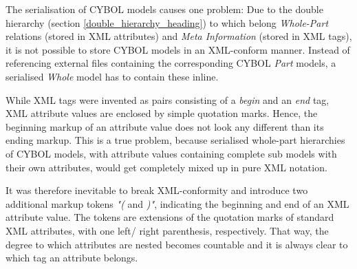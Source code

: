 The serialisation of CYBOL models causes one problem: Due to the double
hierarchy (section \ref{double_hierarchy_heading}) to which belong
\emph{Whole-Part} relations (stored in XML attributes) and
\emph{Meta Information} (stored in XML tags), it is not possible to store CYBOL
models in an XML-conform manner. Instead of referencing external files
containing the corresponding CYBOL \emph{Part} models, a serialised
\emph{Whole} model has to contain these inline.

While XML tags were invented as pairs consisting of a \emph{begin} and an
\emph{end} tag, XML attribute values are enclosed by simple quotation marks.
Hence, the beginning markup of an attribute value does not look any different
than its ending markup. This is a true problem, because serialised whole-part
hierarchies of CYBOL models, with attribute values containing complete sub
models with their own attributes, would get completely mixed up in pure XML
notation.

It was therefore inevitable to break XML-conformity and introduce two
additional markup tokens \emph{"(} and \emph{)"}, indicating the beginning and
end of an XML attribute value. The tokens are extensions of the quotation marks
of standard XML attributes, with one left/ right parenthesis, respectively.
That way, the degree to which attributes are nested becomes countable and it is
always clear to which tag an attribute belongs.
